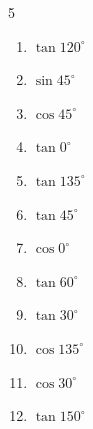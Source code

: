 \begin{multicols}{5}
\begin{enumerate}
  \item $\displaystyle \tan{120^\circ}$


  \item $\displaystyle \sin{45^\circ}$


  \item $\displaystyle \cos{45^\circ}$


  \item $\displaystyle \tan{0^\circ}$

        \phantom{$\displaystyle =0$}

  \item $\displaystyle \tan{135^\circ}$

        \phantom{$\displaystyle =-1$}

  \item $\displaystyle \tan{45^\circ}$

        \phantom{$\displaystyle =1$}

  \item $\displaystyle \cos{0^\circ}$

        \phantom{$\displaystyle =1$}

  \item $\displaystyle \tan{60^\circ}$


  \item $\displaystyle \tan{30^\circ}$


  \item $\displaystyle \cos{135^\circ}$


\columnbreak %

\resetques

  \item $\displaystyle \cos{30^\circ}$


  \item $\displaystyle \tan{150^\circ}$



\end{enumerate}
\end{multicols}
